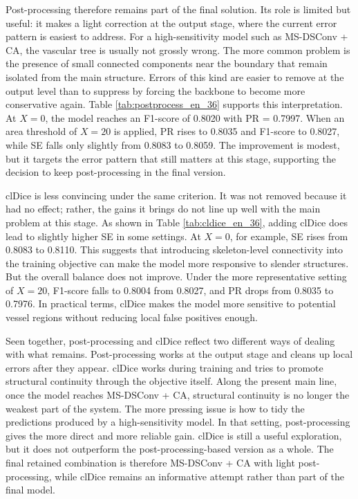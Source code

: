 \documentclass[a4paper,11pt]{article}
\begin{document}
Post-processing therefore remains part of the final solution. Its role is limited but useful: it makes a light correction at the output stage, where the current error pattern is easiest to address. For a high-sensitivity model such as MS-DSConv + CA, the vascular tree is usually not grossly wrong. The more common problem is the presence of small connected components near the boundary that remain isolated from the main structure. Errors of this kind are easier to remove at the output level than to suppress by forcing the backbone to become more conservative again. Table \ref{tab:postprocess_en_36} supports this interpretation. At \(X=0\), the model reaches an F1-score of 0.8020 with PR = 0.7997. When an area threshold of \(X=20\) is applied, PR rises to 0.8035 and F1-score to 0.8027, while SE falls only slightly from 0.8083 to 0.8059. The improvement is modest, but it targets the error pattern that still matters at this stage, supporting the decision to keep post-processing in the final version.

clDice is less convincing under the same criterion. It was not removed because it had no effect; rather, the gains it brings do not line up well with the main problem at this stage. As shown in Table \ref{tab:cldice_en_36}, adding clDice does lead to slightly higher SE in some settings. At \(X=0\), for example, SE rises from 0.8083 to 0.8110. This suggests that introducing skeleton-level connectivity into the training objective can make the model more responsive to slender structures. But the overall balance does not improve. Under the more representative setting of \(X=20\), F1-score falls to 0.8004 from 0.8027, and PR drops from 0.8035 to 0.7976. In practical terms, clDice makes the model more sensitive to potential vessel regions without reducing local false positives enough.

Seen together, post-processing and clDice reflect two different ways of dealing with what remains. Post-processing works at the output stage and cleans up local errors after they appear. clDice works during training and tries to promote structural continuity through the objective itself. Along the present main line, once the model reaches MS-DSConv + CA, structural continuity is no longer the weakest part of the system. The more pressing issue is how to tidy the predictions produced by a high-sensitivity model. In that setting, post-processing gives the more direct and more reliable gain. clDice is still a useful exploration, but it does not outperform the post-processing-based version as a whole. The final retained combination is therefore MS-DSConv + CA with light post-processing, while clDice remains an informative attempt rather than part of the final model.
\end{document}
